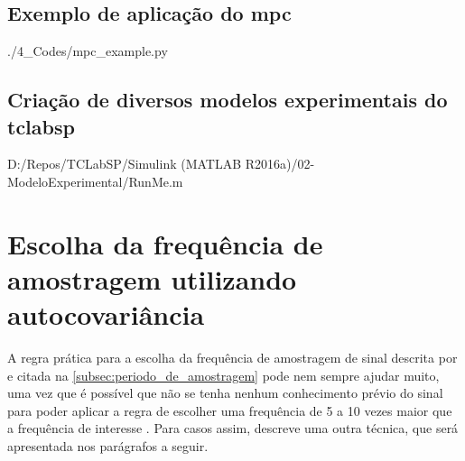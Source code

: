 \begin{apendicesenv}
\section{Exemplo de aplicação do \acrlong{mpc}}


	{./4_Codes/mpc_example.py}
	\begin{center}
	\end{center}

\section{Criação de diversos modelos experimentais do \acrshort{tclabsp}}
\label{sec:tclabsp-models-creation}


	{D:/Repos/TCLabSP/Simulink (MATLAB R2016a)/02-ModeloExperimental/RunMe.m}
	\begin{center}
    \end{center}

\chapter{Escolha da frequência de amostragem utilizando autocovariância}
\label{ch:sampling_time_using_autocorrelation}

A regra prática para a escolha da frequência de amostragem de sinal descrita por 
e citada na \cref{subsec:periodo_de_amostragem} pode nem sempre ajudar muito, uma vez que é possível
que não se tenha nenhum conhecimento prévio do sinal para poder aplicar a regra de escolher uma frequência
de 5 a 10 vezes maior que a frequência de interesse \cite{Aguirre2015}. Para casos assim, 
descreve uma outra técnica, que será apresentada nos parágrafos a seguir. 


\end{apendicesenv}
